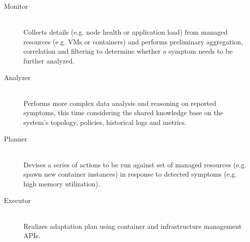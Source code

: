 \begin{description}
  \item[Monitor]
  \hfill \\
  Collects details (e.g. node health or application load) from managed resources (e.g. \acsp{VM} or containers) and performs preliminary aggregation, correlation and filtering to determine whether a symptom needs to be further analyzed.

  \item[Analyzer]
  \hfill \\
  Performs more complex data analysis and reasoning on reported symptoms, this time considering the shared knowledge base on the system's topology, policies, historical logs and metrics.

  \item[Planner]
  \hfill \\
  Devises a series of actions to be run against set of managed resources (e.g. spawn new container instances) in response to detected symptoms (e.g. high memory utilization).

  \item[Executor]
  \hfill \\
  Realizes adaptation plan using container and infrastructure management \acsp{API}.
\end{description}
